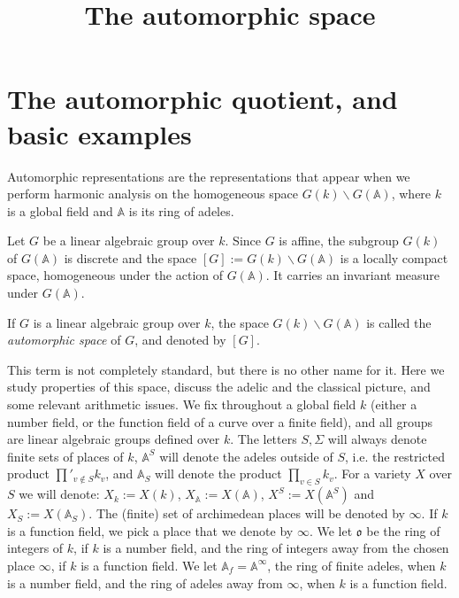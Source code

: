 

%


\title{The automorphic space}


\maketitle

\label{section-phantom}

\tableofcontents

\section{The automorphic quotient, and basic examples}
\label{section-automorphic-quotient}

Automorphic representations are the representations that appear when we perform harmonic analysis on the homogeneous space $G(k)\backslash G(\mathbb A)$, where $k$ is a global field and $\mathbb A$ is its ring of adeles. 


Let $G$ be a linear algebraic group over $k$. Since $G$ is affine, the subgroup $G(k)$ of $G(\mathbb A)$ is discrete and the space $[G]:=G(k)\backslash G(\mathbb A)$ is a locally compact space, homogeneous under the action of $G(\mathbb A)$. It carries an invariant measure under $G(\mathbb A)$.

\begin{definition}
 \label{definition-automorphic-space}
If $G$ is a linear algebraic group over $k$, the space $G(k)\backslash G(\mathbb A)$ is called the {\it automorphic space} of $G$, and denoted by $[G]$. 
\end{definition}
This term is not completely standard, but there is no other name for it. Here we study properties of this space, discuss the adelic and the classical picture, and some relevant arithmetic issues. We fix throughout a global field $k$ (either a number field, or the function field of a curve over a finite field), and all groups are linear algebraic groups defined over $k$. The letters $S, \Sigma$ will always denote finite sets of places of $k$, $\mathbb A^S$ will denote the adeles outside of $S$, i.e. the restricted product $\prod'_{v\notin S} k_v$, and $\mathbb A_S$ will denote the product $\prod_{v\in S} k_v$. For a variety $X$ over $S$ we will denote: $X_k:=X(k)$, $X_{\mathbb A}:=X(\mathbb A)$, $X^S:= X(\mathbb A^S)$ and $X_S:= X(\mathbb A_S)$. The (finite) set of archimedean places will be denoted by $\infty$. If $k$ is a function field, we pick a place that we denote by $\infty$. We let $\mathfrak o$ be the ring of integers of $k$, if $k$ is a number field, and the ring of integers away from the chosen place $\infty$, if $k$ is a function field. We let $\mathbb A_f = \mathbb A^\infty$, the ring of finite adeles, when $k$ is a number field, and the ring of adeles away from $\infty$, when $k$ is a function field. 




